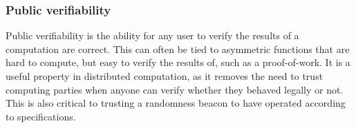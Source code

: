 \subsubsection{Public verifiability}
Public verifiability is the ability for any user to verify the results of a computation are correct. This can often be tied to asymmetric functions that are hard to compute, but easy to verify the results of, such as a proof-of-work. It is a useful property in distributed computation, as it removes the need to trust computing parties when anyone can verify whether they behaved legally or not. This is also critical to trusting a randomness beacon to have operated according to specifications. 

